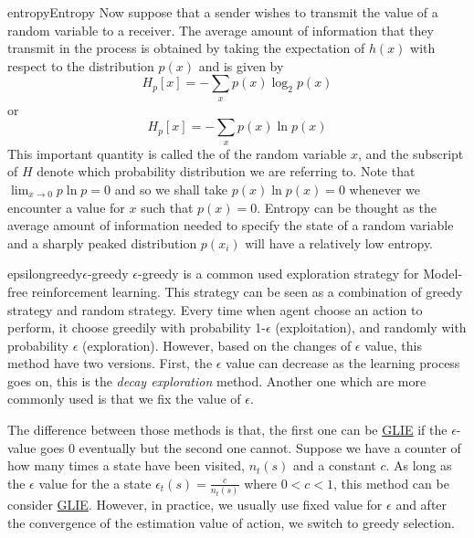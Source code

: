 \documentclass[9pt]{article}
\begin{document}
\begin{topic}{entropy}{Entropy}
Now suppose that a sender wishes to transmit the value of a random variable to a receiver. The average amount of information that they transmit in the process is obtained by taking the expectation of $h(x)$ with respect to the distribution $p(x)$ and is given by
\[
H_p[x] = -\sum_x p(x) \log_2 p(x)
\]
or
\[
H_p[x] = -\sum_x p(x) \ln p(x)
\]
This important quantity is called the \textit{\color{red}{entropy}} of the random variable $x$, and the subscript of $H$ denote which probability distribution we are referring to. Note that $\lim_{x\to 0}p \ln p = 0$ and so we shall take $p(x) \ln p(x) = 0$ whenever we encounter a value for $x$ such that $p(x) = 0$.  Entropy can be thought as the average amount of information needed to specify the state of a random variable and a sharply peaked distribution $p(x_i)$ will have a relatively low entropy. 


\end{topic}
\begin{topic}{epsilongreedy}{\texorpdfstring{$\epsilon$}--greedy}
$\epsilon$-greedy is a common used exploration strategy for Model-free reinforcement learning. This strategy can be seen as a combination of greedy strategy and random strategy. Every time when agent choose an action to perform, it choose greedily with probability 1-$\epsilon$ (exploitation), and randomly with probability $\epsilon$ (exploration). However, based on the changes of $\epsilon$ value, this method have two versions. First, the $\epsilon$ value can decrease as the learning process goes on, this is the \textit{decay exploration} method. Another one which are more commonly used is that we fix the value of $\epsilon$. 

The difference between those methods is that, the first one can be \hyperlink{glie}{GLIE} if the $\epsilon$-value goes 0 eventually but the second one cannot. Suppose we have a counter of how many times a state have been visited, $n_t(s)$ and a constant $c$. As long as the $\epsilon$ value for the a state $\epsilon_t(s) = \frac{c}{n_t(s)}$ where $0<c<1$, this method can be consider \hyperlink{glie}{GLIE}. However, in practice, we usually use fixed value for $\epsilon$ and after the convergence of the estimation value of action, we switch to greedy selection. 
\end{topic}
\end{document}
